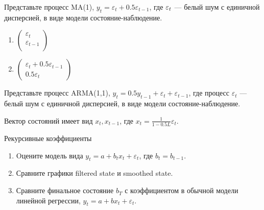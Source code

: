 \begin{problem}
Представьте процесс MA(1),
$y_{t}=\varepsilon_{t}+0.5\varepsilon_{t-1}$, где $\varepsilon_t$ —   белый шум с единичной дисперсией,
	в виде модели состояние-наблюдение.
\begin{enumerate}
\item $\left(%
\begin{array}{c}
  \varepsilon_{t} \\
  \varepsilon_{t-1} \\
\end{array}%
\right)$ \\
\item $\left(%
\begin{array}{c}
  \varepsilon_{t}+0.5\varepsilon_{t-1} \\
  0.5\varepsilon_{t}
\end{array}%
\right)$
\end{enumerate}


\begin{sol}
\end{sol}
\end{problem}


\begin{problem}
Представьте процесс ARMA(1,1),
$y_{t}=0.5y_{t-1}+\varepsilon_{t}+\varepsilon_{t-1}$,
где процесс $\varepsilon_t$ —  белый шум с единичной дисперсией, в
виде модели состояние-наблюдение.

Вектор состояний имеет вид $x_{t},x_{t-1}$, где
$x_{t}=\frac{1}{1-0.5L}\varepsilon_{t}$.


\begin{sol}
\end{sol}
\end{problem}



\begin{problem}
Рекурсивные коэффициенты
\begin{enumerate}
\item Oцените модель вида $y_{t}=a+b_{t}x_{t}+\varepsilon_{t}$,
где $b_{t}=b_{t-1}$.
\item Сравните графики filtered state и smoothed state.
\item Сравните финальное состояние $b_{T}$ с коэффициентом в
обычной модели линейной регрессии, $y_{t}=a+bx_{t}+\varepsilon_{t}$.
\end{enumerate}


\begin{sol}
\end{sol}
\end{problem}




